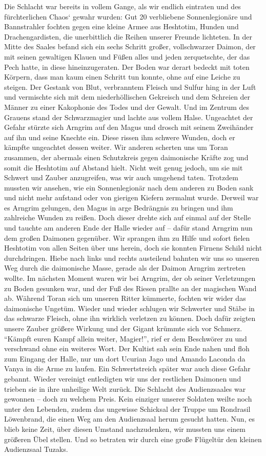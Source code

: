 Die Schlacht war bereits in vollem Gange, als wir endlich eintraten und des fürchterlichen Chaos‘ gewahr wurden: Gut 20 verbliebene Sonnenlegionäre und Bannstrahler fochten gegen eine kleine Armee aus Heshtotim, Hunden und Drachengardisten, die unerbittlich die Reihen unserer Freunde lichteten. In der Mitte des Saales befand sich ein sechs Schritt großer, vollschwarzer Daimon, der mit seinen gewaltigen Klauen und Füßen alles und jeden zerquetschte, der das Pech hatte, in diese hineinzugeraten. Der Boden war derart bedeckt mit toten Körpern, dass man kaum einen Schritt tun konnte, ohne auf eine Leiche zu steigen. Der Gestank von Blut, verbranntem Fleisch und Sulfur hing in der Luft und vermischte sich mit dem niederhöllischen Gekreisch und dem Schreien der Männer zu einer Kakophonie des Todes und der Gewalt. Und im Zentrum des Grauens stand der Schwarzmagier und lachte aus vollem Halse. Ungeachtet der Gefahr stürzte sich Arngrim auf den Magus und drosch mit seinem Zweihänder auf ihn und seine Knechte ein. Diese rissen ihm schwere Wunden, doch er kämpfte ungeachtet dessen weiter. Wir anderen scherten uns um Toran zusammen, der abermals einen Schutzkreis gegen daimonische Kräfte zog und somit die Heshtotim auf Abstand hielt. Nicht weit genug jedoch, um sie mit Schwert und Zauber anzugreifen, was wir auch umgehend taten. Trotzdem mussten wir ansehen, wie ein Sonnenlegionär nach dem anderen zu Boden sank und nicht mehr aufstand oder von gierigen Kiefern zermalmt wurde. Derweil war es Arngrim gelungen, den Magus in arge Bedrängnis zu bringen und ihm zahlreiche Wunden zu reißen. Doch dieser drehte sich auf einmal auf der Stelle und tauchte am anderen Ende der Halle wieder auf -- dafür stand Arngrim nun dem großen Daimonen gegenüber. Wir sprangen ihm zu Hilfe und sofort fielen Heshtotim von allen Seiten über uns herein, doch sie konnten Firnens Schild nicht durchdringen. Hiebe nach links und rechts austeilend bahnten wir uns so unseren Weg durch die daimonische Masse, gerade als der Daimon Arngrim zertreten wollte. Im nächsten Moment waren wir bei Arngrim, der ob seiner Verletzungen zu Boden gesunken war, und der Fuß des Riesen prallte an der magischen Wand ab. Während Toran sich um unseren Ritter kümmerte, fochten wir wider das daimonische Ungetüm. Wieder und wieder schlugen wir Schwerter und Stäbe in das schwarze Fleisch, ohne ihn wirklich verletzen zu können. Doch dafür zeigten unsere Zauber größere Wirkung und der Gigant krümmte sich vor Schmerz. ``Kämpft euren Kampf allein weiter, Magier!'', rief er dem Beschwörer zu und verschwand ohne ein weiteres Wort. Der Kultist sah sein Ende nahen und floh zum Eingang der Halle, nur um dort Ucurian Jago und Amando Laconda da Vanya in die Arme zu laufen. Ein Schwertstreich später war auch diese Gefahr gebannt. Wieder vereinigt entledigten wir uns der restlichen Daimonen und trieben sie in ihre unheilige Welt zurück. Die Schlacht des Audienzsaales war gewonnen -- doch zu welchem Preis. Kein einziger unserer Soldaten weilte noch unter den Lebenden, zudem das ungewisse Schicksal der Truppe um Rondrasil Löwenbrand, die einen Weg am den Audienzsaal herum gesucht hatten. Nun, es blieb keine Zeit, über diesen Umstand nachzudenken, wir mussten uns einem größeren Übel stellen. Und so betraten wir durch eine große Flügeltür den kleinen Audienzsaal Tuzaks.

